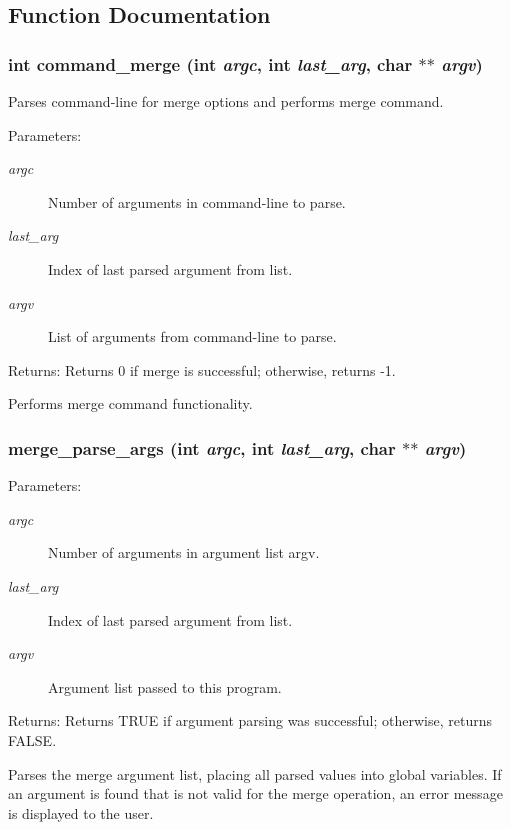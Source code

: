 \subsection{Function Documentation}
\subsubsection{\setlength{\rightskip}{0pt plus 5cm}int command\_\-merge (int {\em argc}, int {\em last\_\-arg}, char $\ast$$\ast$ {\em argv})}\label{merge_8c_a6}


Parses command-line for merge options and performs merge command. 

\begin{Desc}
\item[Parameters:]
\begin{description}
\item[{\em argc}]Number of arguments in command-line to parse. \item[{\em last\_\-arg}]Index of last parsed argument from list. \item[{\em argv}]List of arguments from command-line to parse.\end{description}
\end{Desc}
\begin{Desc}
\item[Returns:]Returns 0 if merge is successful; otherwise, returns -1.\end{Desc}
Performs merge command functionality. 
\subsubsection{ merge\_\-parse\_\-args (int {\em argc}, int {\em last\_\-arg}, char $\ast$$\ast$ {\em argv})}\label{merge_8c_a5}


\begin{Desc}
\item[Parameters:]
\begin{description}
\item[{\em argc}]Number of arguments in argument list argv. \item[{\em last\_\-arg}]Index of last parsed argument from list. \item[{\em argv}]Argument list passed to this program.\end{description}
\end{Desc}
\begin{Desc}
\item[Returns:]Returns TRUE if argument parsing was successful; otherwise, returns FALSE.\end{Desc}
Parses the merge argument list, placing all parsed values into global variables. If an argument is found that is not valid for the merge operation, an error message is displayed to the user. 
